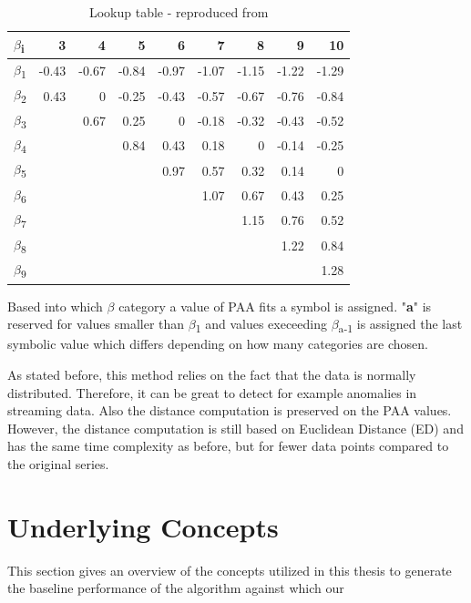 \documentclass[phd,black, hidelinks]{PrincetonThesis}
\begin{document}
\begin{table}[htbp]
\caption{\label{tab:org48e1903}Lookup table - reproduced from \citeauthor{Lin_2007}}
\centering
\begin{tabular}{lrrrrrrrr}
\(\beta\)\textsubscript{i} & 3 & 4 & 5 & 6 & 7 & 8 & 9 & 10\\
\hline
\(\beta\)\textsubscript{1} & -0.43 & -0.67 & -0.84 & -0.97 & -1.07 & -1.15 & -1.22 & -1.29\\
\(\beta\)\textsubscript{2} & 0.43 & 0 & -0.25 & -0.43 & -0.57 & -0.67 & -0.76 & -0.84\\
\(\beta\)\textsubscript{3} &  & 0.67 & 0.25 & 0 & -0.18 & -0.32 & -0.43 & -0.52\\
\(\beta\)\textsubscript{4} &  &  & 0.84 & 0.43 & 0.18 & 0 & -0.14 & -0.25\\
\(\beta\)\textsubscript{5} &  &  &  & 0.97 & 0.57 & 0.32 & 0.14 & 0\\
\(\beta\)\textsubscript{6} &  &  &  &  & 1.07 & 0.67 & 0.43 & 0.25\\
\(\beta\)\textsubscript{7} &  &  &  &  &  & 1.15 & 0.76 & 0.52\\
\(\beta\)\textsubscript{8} &  &  &  &  &  &  & 1.22 & 0.84\\
\(\beta\)\textsubscript{9} &  &  &  &  &  &  &  & 1.28\\
\hline
\end{tabular}
\end{table}

Based into which \(\beta\) category a value of PAA fits a symbol is assigned. "\textbf{a}" is reserved for values smaller than \(\beta\)\textsubscript{1} and values execeeding \(\beta\)\textsubscript{a-1} is assigned the last symbolic value which differs depending on how many categories are chosen.

As stated before, this method relies on the fact that the data is normally distributed. Therefore, it can be great to detect for example anomalies in streaming data. Also the distance computation is preserved on the PAA values. However, the distance computation is still based on Euclidean Distance (ED) and has the same time complexity as before, but for fewer data points compared to the original series.
\chapter{Underlying Concepts}
\label{sec:org15899a6}
This section gives an overview of the concepts utilized in this thesis to generate the baseline performance of the algorithm against which our
\end{document}
